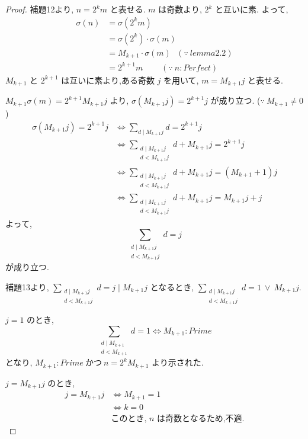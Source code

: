 \begin{proof}
補題12より, \(n = 2^km\) と表せる. \(m\) は奇数より, \(2^k\) と互いに素.
よって,
\begin{align*}
  \sigma(n) &= \sigma(2^km)\\
            &= \sigma(2^k) \cdot \sigma(m)\\
            &= M_{k+1} \cdot \sigma(m)~~~(\because~lemma2.2)\\
            &= 2^{k+1}m~~~~~~~~~~(\because~n : Perfect)
\end{align*}
\(M_{k+1}\) と \(2^{k+1}\) は互いに素より,ある奇数 \(j\) を用いて, \(m = M_{k+1}j\) と表せる.

\(M_{k+1} \sigma(m) = 2^{k+1} M_{k+1}j\) より, \(\sigma(M_{k+1}j) = 2^{k+1}j\) が成り立つ. (\(\because~M_{k+1} \neq 0\))
\begin{align*}
  \sigma(M_{k+1}j) = 2^{k+1}j &\Leftrightarrow \sum_{d \mid M_{k+1}j} d = 2^{k+1}j\\
                              &\Leftrightarrow \sum_{\substack{d \mid M_{k+1}j\\ d < M_{k+1}j}} d + M_{k+1}j = 2^{k+1}j\\
                              &\Leftrightarrow \sum_{\substack{d \mid M_{k+1}j\\ d < M_{k+1}j}} d + M_{k+1}j = (M_{k+1}+1)j\\
                              &\Leftrightarrow \sum_{\substack{d \mid M_{k+1}j\\ d < M_{k+1}j}} d + M_{k+1}j = M_{k+1}j + j
\end{align*}
よって, \[\sum_{\substack{d \mid M_{k+1}j\\ d < M_{k+1}j}} d = j\] が成り立つ.

補題13より, \(\sum_{\substack{d \mid M_{k+1}j\\ d < M_{k+1}j}} d = j \mid M_{k+1}j\) となるとき,
\(\sum_{\substack{d \mid M_{k+1}j\\ d < M_{k+1}j}} d = 1~\vee~M_{k+1}j\).

\(j = 1\) のとき,
\[
  \sum_{\substack{d \mid M_{k+1}\\ d < M_{k+1}}} d = 1 \Leftrightarrow M_{k+1} : Prime
\]となり, \(M_{k+1} : Prime ~\text{かつ} ~n = 2^kM_{k+1}\) より示された.

\(j = M_{k+1}j\) のとき,
\begin{align*}
  j = M_{k+1}j &\Leftrightarrow M_{k+1} = 1\\
               &\Leftrightarrow k = 0\\
               &\text{このとき, \(n\) は奇数となるため,不適.}
\end{align*}
\end{proof}


